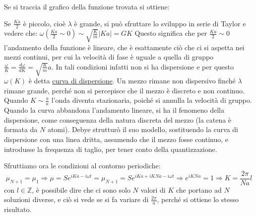 Se si traccia il grafico della funzione trovata si ottiene:


Se $\frac{ K a}{2 }$ è piccolo, cioè $\lambda$ è grande, si può sfruttare lo sviluppo in serie di Taylor e vedere che:
$ \omega (\frac{ Ka}{2 } \sim 0) \sim \sqrt{\frac{ K}{m }} |K a| = G K$
Questo significa che per $\frac{ Ka}{2 } \sim 0$ l'andamento della funzione è lineare, che è esattamente ciò che ci si aspetta nei mezzi continui, per cui la velocità di fase è uguale a quella di gruppo $\frac{ \omega}{K } = \frac{ d\omega}{dK } = \sqrt{\frac{ K}{m }}a$.
In tali condizioni infatti non si ha dispersione e per questo $\omega(K)$ è detta \underline{curva di dispersione}.
Un mezzo rimane non dispersivo finché $\lambda$ rimane grande, perché non si percepisce che il mezzo è discreto e non continuo.
Quando $K \sim \frac{ \pi}{ a}$ l'onda diventa stazionaria, poiché si annulla la velocità di gruppo.
Quando la curva abbandona l'andamento lineare, si ha il fenomeno della dispersione, come conseguenza della natura discreta del mezzo (la catena è formata da $N$ atomi).
Debye strutturò il suo modello, sostituendo la curva di dispersione con una linea dritta, assumendo che il mezzo fosse continuo, e introdusse la frequenza di taglio,
per tener conto della quantizzazione.

Sfruttiamo ora le condizioni al contorno periodiche:
\begin{equation}
\mu_{N+1} = \mu_1 \Rightarrow \mu = S e^{ i K a - i \omega t } = \mu_{N+1} = S e^{ i K a + i K N a - i \omega t } \Rightarrow e^{ i K N a } = 1 \Rightarrow K = \frac{ 2 \pi}{N a } l
\end{equation}
con $l \in \mathbb{Z}$, è possibile dire che ci sono solo $N$ valori di $K$ che portano ad $N$ soluzioni diverse, e ciò si vede se si fa variare di $\frac{ 2\pi}{a }$, perché si ottiene lo stesso risultato. 





















